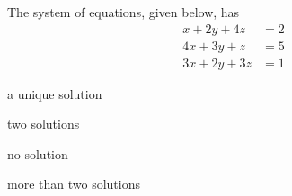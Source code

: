     \item The system of equations, given below, has
    \hfill{}
    \begin{align*}
        x+2y+4z &= 2 \\
        4x+3y+z &= 5 \\
        3x+2y+3z &= 1
    \end{align*}
    \begin{enumerate}
        \begin{multicols}{2}
            \item a unique solution
            \item two solutions
            \item no solution
            \item more than two solutions
        \end{multicols}
    \end{enumerate}
